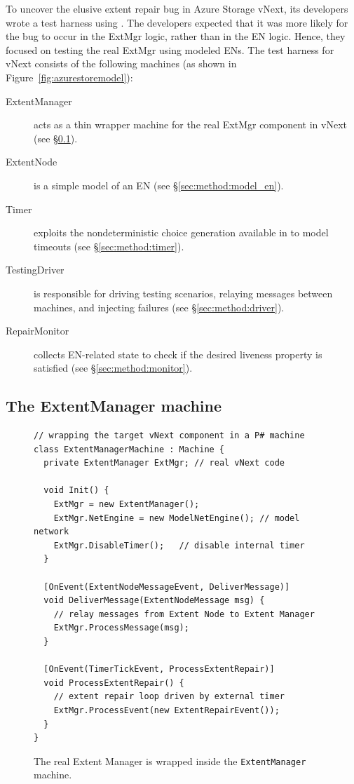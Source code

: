 To uncover the elusive extent repair bug in Azure Storage vNext, its developers wrote a test harness using \psharp. The developers expected that it was more likely for the bug to occur in the ExtMgr logic, rather than in the EN logic. Hence, they focused on testing the real ExtMgr using modeled ENs. The test harness for vNext consists of the following \psharp machines (as shown in Figure~\ref{fig:azurestoremodel}):

\begin{description}
\item[ExtentManager] acts as a thin wrapper machine for the real ExtMgr component in vNext (see \S\ref{sec:method:wrap_target}).

\item[ExtentNode] is a simple model of an EN (see \S\ref{sec:method:model_en}).

\item[Timer] exploits the nondeterministic choice generation available in \psharp to model timeouts (see \S\ref{sec:method:timer}).

\item[TestingDriver] is responsible for driving testing scenarios, relaying messages between machines, and injecting failures (see \S\ref{sec:method:driver}).

\item[RepairMonitor] collects EN-related state to check if the desired liveness property is satisfied (see \S\ref{sec:method:monitor}).
\end{description}

\subsection{The ExtentManager machine}
\label{sec:method:wrap_target}

\begin{figure}[t]
\begin{lstlisting}
// wrapping the target vNext component in a P# machine
class ExtentManagerMachine : Machine {
  private ExtentManager ExtMgr; // real vNext code

  void Init() {
    ExtMgr = new ExtentManager();
    ExtMgr.NetEngine = new ModelNetEngine(); // model network
    ExtMgr.DisableTimer();	 // disable internal timer
  }

  [OnEvent(ExtentNodeMessageEvent, DeliverMessage)]
  void DeliverMessage(ExtentNodeMessage msg) {
    // relay messages from Extent Node to Extent Manager
    ExtMgr.ProcessMessage(msg);
  }
	
  [OnEvent(TimerTickEvent, ProcessExtentRepair)]
  void ProcessExtentRepair() {
    // extent repair loop driven by external timer
    ExtMgr.ProcessEvent(new ExtentRepairEvent());
  }
}
\end{lstlisting}
\vspace{-3mm}
\caption{The real Extent Manager is wrapped inside the \texttt{ExtentManager} \psharp machine.}
\label{fig:wrap_target}
\vspace{-1mm}
\end{figure}


